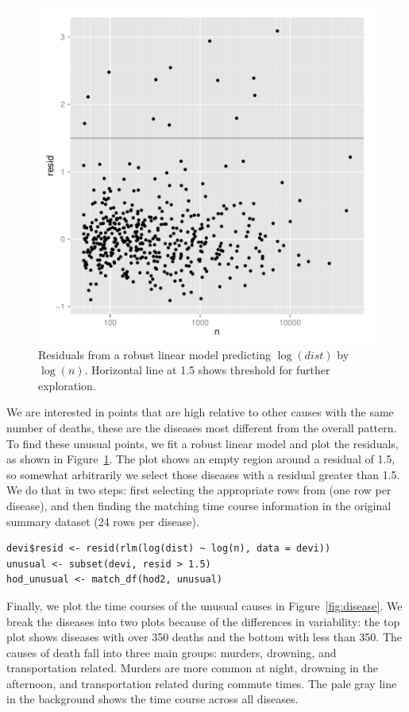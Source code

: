 \documentclass[article]{jss}
\begin{document}
\begin{figure}[htbp]
  \centering
    \includegraphics[width=0.5\linewidth]{case-study/n-dist-resid}
  \caption{Residuals from a robust linear model predicting $\log(dist)$ by $\log(n)$. Horizontal line at 1.5 shows threshold for further exploration.}
  \label{fig:devi-resid}
\end{figure}

We are interested in points that are high relative to other causes with the same number of deaths, these are the diseases most different from the overall pattern. To find these unusual points, we fit a robust linear model and plot the residuals, as shown in Figure~\ref{fig:devi-resid}. The plot shows an empty region around a residual of 1.5, so somewhat arbitrarily we select those diseases with a residual greater than 1.5. We do that in two steps: first selecting the appropriate rows from  (one row per disease), and then finding the matching time course information in the original summary dataset (24 rows per disease).

\begin{Verbatim}
devi$resid <- resid(rlm(log(dist) ~ log(n), data = devi))
unusual <- subset(devi, resid > 1.5)
hod_unusual <- match_df(hod2, unusual)
\end{Verbatim}

Finally, we plot the time courses of the unusual causes in Figure~\ref{fig:disease}. We break the diseases into two plots because of the differences in variability: the top plot shows diseases with over 350 deaths and the bottom with less than 350. The causes of death fall into three main groups: murders, drowning, and transportation related. Murders are more common at night, drowning in the afternoon, and transportation related during commute times. The pale gray line in the background shows the time course across all diseases.
\end{document}
